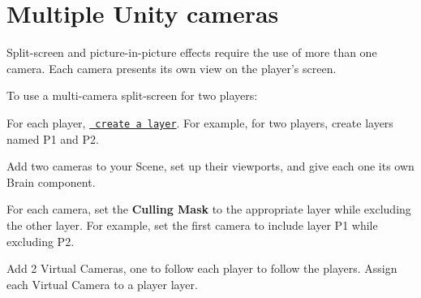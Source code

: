 \chapter{Multiple Unity cameras}
\hypertarget{md__hey_tea_9_2_library_2_package_cache_2com_8unity_8cinemachine_0d2_89_87_2_documentation_0i_2_cinemachine_multiple_cameras}{}\label{md__hey_tea_9_2_library_2_package_cache_2com_8unity_8cinemachine_0d2_89_87_2_documentation_0i_2_cinemachine_multiple_cameras}
\label{md__hey_tea_9_2_library_2_package_cache_2com_8unity_8cinemachine_0d2_89_87_2_documentation_0i_2_cinemachine_multiple_cameras_autotoc_md705}%
%
 Split-\/screen and picture-\/in-\/picture effects require the use of more than one  camera. Each  camera presents its own view on the player’s screen.

To use a multi-\/camera split-\/screen for two players\+:


\begin{DoxyEnumerate}
\item For each player, \href{https://docs.unity3d.com/Manual/Layers.html}{\texttt{ create a layer}}. For example, for two players, create layers named P1 and P2.
\item Add two  cameras to your Scene, set up their viewports, and give each one its own  Brain component.
\item For each  camera, set the {\bfseries{Culling Mask}} to the appropriate layer while excluding the other layer. For example, set the first  camera to include layer P1 while excluding P2.
\item Add 2 Virtual Cameras, one to follow each player to follow the players. Assign each Virtual Camera to a player layer. 
\end{DoxyEnumerate}
